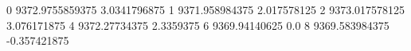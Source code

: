 0 9372.9755859375 3.0341796875
1 9371.958984375 2.017578125
2 9373.017578125 3.076171875
4 9372.27734375 2.3359375
6 9369.94140625 0.0
8 9369.583984375 -0.357421875
